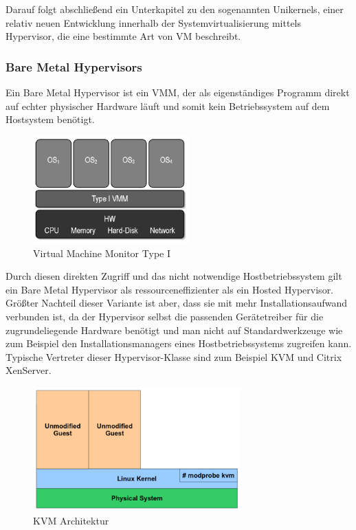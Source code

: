 Darauf folgt abschließend ein Unterkapitel zu den sogenannten Unikernels, einer relativ neuen Entwicklung innerhalb der Systemvirtualisierung mittels Hypervisor, die eine bestimmte Art von \ac{VM} beschreibt.

\subsubsection{Bare Metal Hypervisors}

Ein Bare Metal Hypervisor ist ein \ac{VMM}, der als eigenständiges Programm direkt auf echter physischer Hardware läuft und somit kein Betriebssystem auf dem Hostsystem benötigt.

\begin{figure}[!ht]
  \begin{center}
    \includegraphics[width=6cm]{bilder/VMM-Type1.jpg}
    \caption{Virtual Machine Monitor Type I \citep{wiki:002}}
  \end{center}
\end{figure}

Durch diesen direkten Zugriff und das nicht notwendige Hostbetriebssystem gilt ein Bare Metal Hypervisor als ressourceneffizienter als ein Hosted Hypervisor. Größter Nachteil dieser Variante ist aber, dass sie mit mehr Installationsaufwand verbunden ist, da der Hypervisor selbst die passenden Gerätetreiber für die zugrundeliegende Hardware benötigt und man nicht auf Standardwerkzeuge wie zum Beispiel den Installationsmanagers eines Hostbetriebssystems zugreifen kann. Typische Vertreter dieser Hypervisor-Klasse sind zum Beispiel KVM und Citrix XenServer.

\begin{figure}[!ht]
  \begin{center}
    \includegraphics[width=8cm]{bilder/kvm.png}
    \caption{KVM Architektur \citep{kvm:002}}
  \end{center}
\end{figure}

